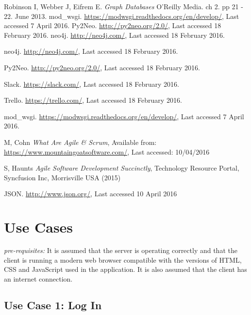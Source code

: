 \documentclass[12pt,onecolumn]{article}
\begin{document}
\begin{thebibliography}{1}
		 Robinson I, Webber J, Eifrem E. \emph{Graph Databases} O'Reilly Media. ch 2. pp 21 - 22. June 2013.
		 mod\_wsgi. \url{https://modwsgi.readthedocs.org/en/develop/}, Last accessed 7 April 2016.
		 Py2Neo. \url{http://py2neo.org/2.0/}, Last accessed 18 February 2016.
		 neo4j. \url{http://neo4j.com/}, Last accessed 18 February 2016.
		
		 neo4j. \url{http://neo4j.com/}, Last accessed 18 February 2016.
		
		 Py2Neo. \url{http://py2neo.org/2.0/}, Last accessed 18 February 2016.
		
		 Slack. \url{https://slack.com/}, Last accessed 18 February 2016.
		
		 Trello. \url{https://trello.com/}, Last accessed 18 February 2016.
		
		 mod\_wsgi. \url{https://modwsgi.readthedocs.org/en/develop/}, Last accessed 7 April 2016.
		
		
		 M, Cohn \emph{What Are Agile \& Scrum}, Available from: \url{https://www.mountaingoatsoftware.com/}, Last accessed: 10/04/2016
		
		 S, Haunts \emph{Agile Software Development Succinctly}, Technology Resource Portal, Syncfusion Inc, Morrisville USA (2015)
		
		 JSON. \url{http://www.json.org/}, Last accessed 10 April 2016
		
		
	\end{thebibliography}
	
	\newpage
	
	\appendix
	
	\section{Use Cases} \label{moreusecase}
	
	\emph{pre-requisites:} It is assumed that the server is operating correctly and that the client is running a modern web browser compatible with the versions of HTML, CSS and JavaScript used in the application. It is also assumed that the client has an internet connection.
	
	\subsection{Use Case 1: Log In}
\end{document}
